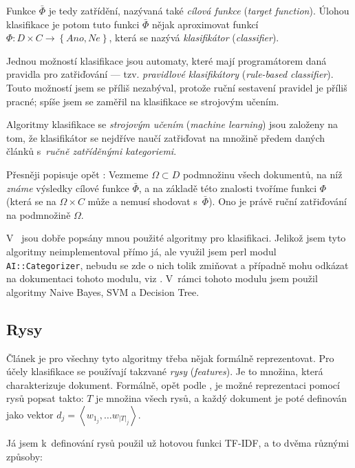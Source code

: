 \documentclass[12pt,a4paper]{report}
\begin{document}
Funkce $\bar{\Phi}$ je tedy  zatřídění, nazývaná také \emph{cílová funkce} (\emph{target function}). Úlohou klasifikace je potom tuto funkci $\bar{\Phi}$ nějak aproximovat funkcí $\Phi: D \times C \rightarrow \left\{Ano, Ne\right\}$, která se nazývá \emph{klasifikátor} (\emph{classifier}).

Jednou možností klasifikace jsou automaty, které mají programátorem daná pravidla pro zatřiďování --- tzv. \emph{pravidlové klasifikátory} (\emph{rule-based classifier}). Touto možností jsem se příliš nezabýval, protože ruční sestavení pravidel je příliš pracné; spíše jsem se zaměřil na klasifikace se strojovým učením.

Algoritmy klasifikace se \emph{strojovým učením} (\emph{machine learning}) jsou založeny na tom, že klasifikátor se nejdříve naučí zatřiďovat na množině předem daných článků s~\emph{ručně zatříděnými kategoriemi}.

Přesněji popisuje opět \cite{machine_intro}: Vezmeme $\Omega \subset D$ podmnožinu všech dokumentů, na níž \emph{známe} výsledky cílové funkce $\bar{\Phi}$, a na základě této znalosti tvoříme funkci $\Phi$ (která se na $\Omega\times C$ může a nemusí shodovat s~$\bar{\Phi}$). Ono  je právě ruční zatřiďování na podmnožině $\Omega$.

V~\cite{machine_intro} jsou dobře popsány mnou použité algoritmy pro klasifikaci. Jelikož jsem tyto algoritmy neimplementoval přímo já, ale využil jsem perl modul \texttt{AI::Categorizer}, nebudu se zde o nich tolik zmiňovat a případně mohu odkázat na dokumentaci tohoto mo\-du\-lu, viz \cite{algorithmnaivebayes}. V~rámci tohoto mo\-du\-lu jsem použil algoritmy Naive Bayes, SVM a Decision Tree.


\subsection{Rysy}

Článek je pro všechny tyto algoritmy třeba nějak formálně reprezentovat. Pro účely klasifikace se používají takzvané \emph{rysy} (\emph{features}). Je to množina, která charakterizuje dokument. Formálně, opět podle \cite{machine_intro}, je možné reprezentaci pomocí rysů popsat takto: $T$ je množina všech rysů, a každý dokument je poté definován jako vektor $d_j=\left<w_{1_j}, \ldots w_{\left|T\right|_j}\right>$.

Já jsem k~definování rysů použil už hotovou funkci TF-IDF, a to dvěma různými způsoby:
\end{document}
